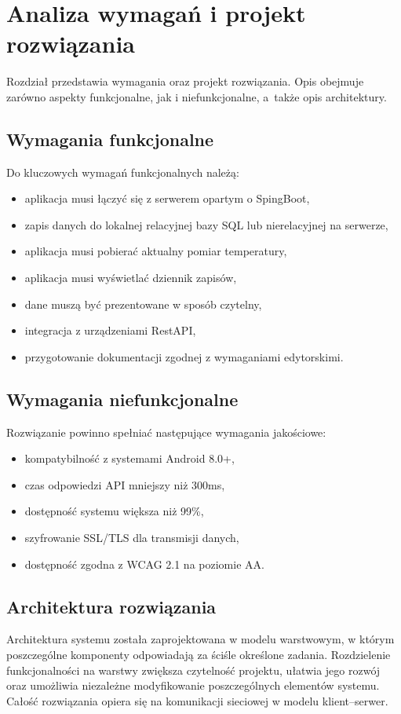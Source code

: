\chapter{Analiza wymagań i projekt rozwiązania}
Rozdział przedstawia wymagania oraz projekt rozwiązania. Opis obejmuje zarówno aspekty funkcjonalne,
jak i niefunkcjonalne, a~także opis architektury.

\section{Wymagania funkcjonalne}
Do kluczowych wymagań funkcjonalnych należą:
\begin{itemize}
    \item aplikacja musi łączyć się z serwerem opartym o SpingBoot,
    \item zapis danych do lokalnej relacyjnej bazy SQL lub nierelacyjnej na serwerze,
    \item aplikacja musi pobierać aktualny pomiar temperatury,
    \item aplikacja musi wyświetlać dziennik zapisów,
    \item dane muszą być prezentowane w sposób czytelny,
    \item integracja z urządzeniami RestAPI,
    \item przygotowanie dokumentacji zgodnej z wymaganiami edytorskimi.
\end{itemize}

\section{Wymagania niefunkcjonalne}
Rozwiązanie powinno spełniać następujące wymagania jakościowe:
\begin{itemize}
    \item kompatybilność z systemami Android 8.0+,
    \item czas odpowiedzi API mniejszy niż 300ms,
    \item dostępność systemu większa niż 99\%,
    \item szyfrowanie SSL/TLS dla transmisji danych,
    \item dostępność zgodna z WCAG 2.1 na poziomie AA.
\end{itemize}

\section{Architektura rozwiązania}
Architektura systemu została zaprojektowana w modelu warstwowym, w którym poszczególne komponenty odpowiadają za ściśle określone zadania. Rozdzielenie funkcjonalności na warstwy zwiększa czytelność projektu, ułatwia jego rozwój oraz umożliwia niezależne modyfikowanie poszczególnych elementów systemu. Całość rozwiązania opiera się na komunikacji sieciowej w modelu klient–serwer.

